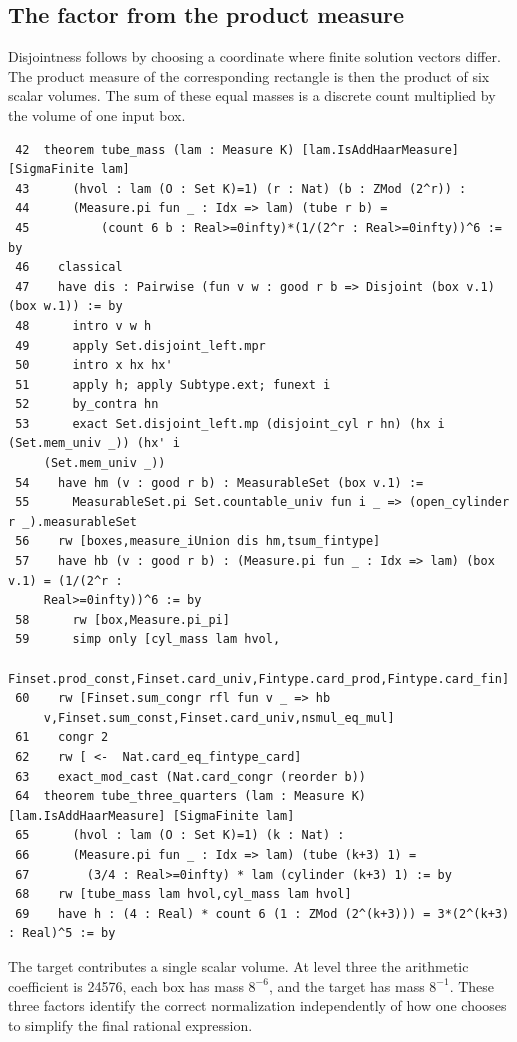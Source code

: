 \documentclass[12pt,letterpaper]{article}
\begin{document}
\clearpage{}\subsection*{The factor from the product measure}
Disjointness follows by choosing a coordinate where finite solution vectors differ. The product measure of the corresponding rectangle is then the product of six scalar volumes. The sum of these equal masses is a discrete count multiplied by the volume of one input box.
\par
{\fontsize{8.8}{10.5}\selectfont\begin{verbatim}
 42  theorem tube_mass (lam : Measure K) [lam.IsAddHaarMeasure] [SigmaFinite lam]
 43      (hvol : lam (O : Set K)=1) (r : Nat) (b : ZMod (2^r)) :
 44      (Measure.pi fun _ : Idx => lam) (tube r b) =
 45          (count 6 b : Real>=0infty)*(1/(2^r : Real>=0infty))^6 := by
 46    classical
 47    have dis : Pairwise (fun v w : good r b => Disjoint (box v.1) (box w.1)) := by
 48      intro v w h
 49      apply Set.disjoint_left.mpr
 50      intro x hx hx'
 51      apply h; apply Subtype.ext; funext i
 52      by_contra hn
 53      exact Set.disjoint_left.mp (disjoint_cyl r hn) (hx i (Set.mem_univ _)) (hx' i
     (Set.mem_univ _))
 54    have hm (v : good r b) : MeasurableSet (box v.1) :=
 55      MeasurableSet.pi Set.countable_univ fun i _ => (open_cylinder r _).measurableSet
 56    rw [boxes,measure_iUnion dis hm,tsum_fintype]
 57    have hb (v : good r b) : (Measure.pi fun _ : Idx => lam) (box v.1) = (1/(2^r :
     Real>=0infty))^6 := by
 58      rw [box,Measure.pi_pi]
 59      simp only [cyl_mass lam hvol,
     Finset.prod_const,Finset.card_univ,Fintype.card_prod,Fintype.card_fin]
 60    rw [Finset.sum_congr rfl fun v _ => hb
     v,Finset.sum_const,Finset.card_univ,nsmul_eq_mul]
 61    congr 2
 62    rw [ <-  Nat.card_eq_fintype_card]
 63    exact_mod_cast (Nat.card_congr (reorder b))
 64  theorem tube_three_quarters (lam : Measure K) [lam.IsAddHaarMeasure] [SigmaFinite lam]
 65      (hvol : lam (O : Set K)=1) (k : Nat) :
 66      (Measure.pi fun _ : Idx => lam) (tube (k+3) 1) =
 67        (3/4 : Real>=0infty) * lam (cylinder (k+3) 1) := by
 68    rw [tube_mass lam hvol,cyl_mass lam hvol]
 69    have h : (4 : Real) * count 6 (1 : ZMod (2^(k+3))) = 3*(2^(k+3) : Real)^5 := by
\end{verbatim}}
The target contributes a single scalar volume. At level three the arithmetic coefficient is 24576, each box has mass $8^{-6}$, and the target has mass $8^{-1}$. These three factors identify the correct normalization independently of how one chooses to simplify the final rational expression.
\end{document}
